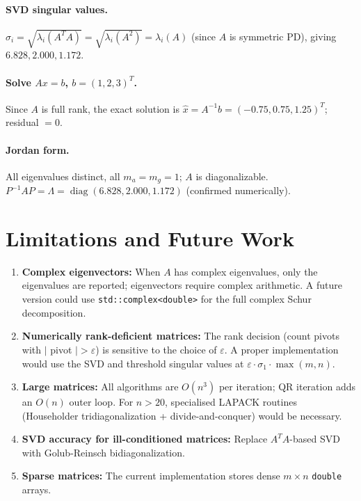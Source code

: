 \documentclass[12pt, a4paper]{article}
\newcommand{\diag}{\operatorname{diag}}
\begin{document}
\paragraph{SVD singular values.} $\sigma_i = \sqrt{\lambda_i(A^TA)} =
\sqrt{\lambda_i(A^2)} = \lambda_i(A)$ (since $A$ is symmetric PD), giving
$6.828, 2.000, 1.172$.

\paragraph{Solve $Ax = b$, $b = (1,2,3)^T$.}
Since $A$ is full rank, the exact solution is
$\hat{x} = A^{-1}b = (-0.75, 0.75, 1.25)^T$; residual $= 0$.

\paragraph{Jordan form.} All eigenvalues distinct, all $m_a = m_g = 1$;
$A$ is diagonalizable.  $P^{-1}AP = \Lambda =
\diag(6.828, 2.000, 1.172)$ (confirmed numerically).

\section{Limitations and Future Work}

\begin{enumerate}[noitemsep]
  \item \textbf{Complex eigenvectors:} When $A$ has complex eigenvalues, only
        the eigenvalues are reported; eigenvectors require complex arithmetic.
        A future version could use \texttt{std::complex<double>} for the full
        complex Schur decomposition.
  \item \textbf{Numerically rank-deficient matrices:} The rank decision
        (count pivots with $|$ pivot $|> \varepsilon$) is sensitive to the
        choice of $\varepsilon$.  A proper implementation would use the SVD
        and threshold singular values at $\varepsilon \cdot \sigma_1 \cdot
        \max(m,n)$.
  \item \textbf{Large matrices:} All algorithms are $O(n^3)$ per iteration;
        QR iteration adds an $O(n)$ outer loop.  For $n > 20$, specialised
        LAPACK routines (Householder tridiagonalization + divide-and-conquer)
        would be necessary.
  \item \textbf{SVD accuracy for ill-conditioned matrices:} Replace
        $A^TA$-based SVD with Golub-Reinsch bidiagonalization.
  \item \textbf{Sparse matrices:} The current implementation stores dense
        $m \times n$ \texttt{double} arrays.
\end{enumerate}
\end{document}
